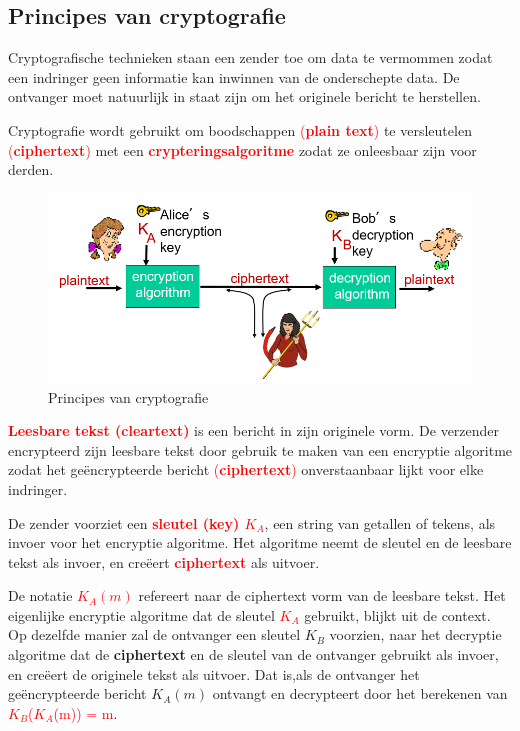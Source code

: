 \subsection{Principes van cryptografie}
Cryptografische technieken staan een zender toe om data te vermommen zodat een indringer geen informatie kan inwinnen van de onderschepte data. De ontvanger moet natuurlijk in staat zijn om het originele bericht te herstellen.

\noindent Cryptografie wordt gebruikt om boodschappen \textcolor{red}{(\textbf{plain text})} te versleutelen \textcolor{red}{(\textbf{ciphertext})} met een \textcolor{red}{\textbf{crypteringsalgoritme}} zodat ze onleesbaar zijn voor derden.

\begin{figure}[h]
    \centering
    \includegraphics[width=7in]{./img/imghfdst8/hfdst8puntje2.png}
    \caption{Principes van cryptografie }      
    \label{fig:Principes van cryptografie }
\end{figure}

\noindent \textcolor{red}{\textbf{Leesbare tekst (cleartext)}} is een bericht in zijn originele vorm. De verzender encrypteerd zijn leesbare tekst door gebruik te maken van een encryptie algoritme zodat het geëncrypteerde bericht \textcolor{red}{(\textbf{ciphertext})} onverstaanbaar lijkt voor elke indringer. 

\noindent De zender voorziet een \textcolor{red}{\textbf{sleutel (key) $K_A$}}, een string van getallen of tekens, als invoer voor het encryptie algoritme. Het algoritme neemt de sleutel en de leesbare tekst als invoer, en creëert \textcolor{red}{\textbf{ciphertext}} als uitvoer.

\noindent De notatie \textcolor{red}{$K_A (m)$} refereert naar de ciphertext vorm van de leesbare tekst. Het eigenlijke encryptie algoritme dat de sleutel \textcolor{red}{$K_A $} gebruikt, blijkt uit de context.
Op dezelfde manier zal de ontvanger een sleutel $K_B$ voorzien, naar het decryptie algoritme dat de \textbf{ciphertext} en de sleutel van de ontvanger gebruikt als invoer, en creëert de originele tekst als uitvoer.
Dat is,als de ontvanger het geëncrypteerde bericht $K_A (m) $ ontvangt en decrypteert door het berekenen van \textcolor{red}{$K_B$($K_A$(m)) = m}.

